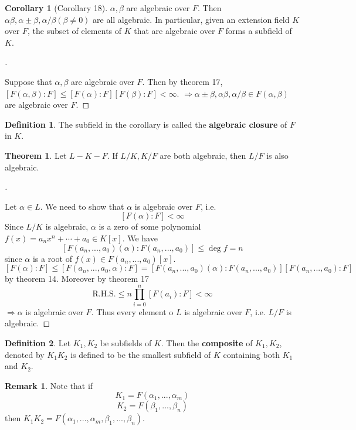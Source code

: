 \documentclass{article}
\theoremstyle{definition}
\newtheorem{thm}{Theorem}
\newtheorem{dfn}{Definition}
\newtheorem{rem}{Remark}
\newtheorem{cor}{Corollary}
\newenvironment{proofs}[1][\proofname]{%
  \begin{proof}[#1]$ $\par\nobreak\ignorespaces
}{%
  \end{proof}
}
\begin{document}
\begin{cor}[Corollary 18]
	$\alpha, \beta$ are algebraic over $F$.
	Then $\alpha \beta, \alpha \pm \beta, \alpha/\beta(\beta \neq 0)$ are all algebraic.
	In particular, given an extension field $K$ over $F$, the subset of elements of $K$ that are algebraic over $F$ forms a subfield of $K$. 
\end{cor}

\begin{proofs}
	Suppose that $\alpha, \beta$ are algebraic over $F$.
	Then by theorem 17, $[F(\alpha, \beta):F] \leq [F(\alpha):F][F(\beta):F] < \infty$.
	$\Rightarrow \alpha \pm \beta, \alpha \beta, \alpha/\beta \in F(\alpha, \beta)$ are algebraic over $F$.
\end{proofs}

\begin{dfn}
	The subfield in the corollary is called the \textbf{algebraic closure} of $F$ in $K$.
\end{dfn}

\begin{thm}
	Let $L-K-F$.
	If $L/K, K/F$ are both algebraic, then $L/F$ is also algebraic.
\end{thm}

\begin{proofs}
	Let $\alpha \in L$.
	We need to show that $\alpha$ is algebraic over $F$, i.e.
	\[
		[F(\alpha):F] < \infty
	\]
	Since $L/K$ is algebraic, $\alpha$ is a zero of some polynomial $f(x) = a_n x^n + \cdots + a_0 \in K[x]$. 
	We have
	\[
		[F(a_n, ..., a_0)(\alpha):F(a_n, ..., a_0)] \leq \deg f = n
	\]
	since $\alpha$ is a root of $f(x) \in F(a_n,..., a_0)[x]$.
	\[
		[F(\alpha):F] \leq [F(a_n, ..., a_0, \alpha):F] = [F(a_n, ..., a_0)(\alpha):F(a_n, ..., a_0)][F(a_n, ..., a_0):F]
	\]
	by theorem 14.
	Moreover by theorem 17
	\[
		\text{R.H.S.} \leq n \prod_{i = 0}^n [F(a_i):F] < \infty
	\]
	$\Rightarrow \alpha$ is algebraic over $F$.
	Thus every element o $L$ is algebraic over $F$, i.e. $L/F$ is algebraic.
\end{proofs}

\begin{dfn}
	Let $K_1, K_2$ be subfields of $K$. 
	Then the \textbf{composite} of $K_1, K_2$, denoted by $K_1 K_2$ is defined to be the smallest subfield of $K$ containing both $K_1$ and $K_2$.
\end{dfn}

\begin{rem}
	Note that if 
	\[
		K_1 = F(\alpha_1, ..., \alpha_m)
	\]
	\[
		K_2 = F(\beta_1, ..., \beta_n)
	\]
	then $K_1K_2 = F(\alpha_1, ..., \alpha_m, \beta_1, ..., \beta_n)$.
\end{rem}
\end{document}
